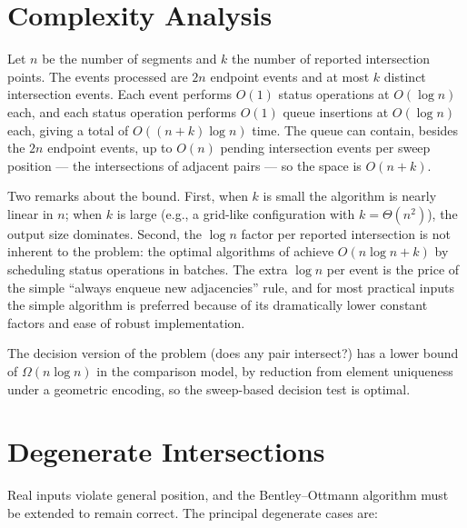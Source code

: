 
\section{Complexity Analysis}
\label{sec:segint_complexity}

Let $n$ be the number of segments and $k$ the number of reported
intersection points. The events processed are $2n$ endpoint events and at
most $k$ distinct intersection events. Each event performs $O(1)$ status
operations at $O(\log n)$ each, and each status operation performs $O(1)$
queue insertions at $O(\log n)$ each, giving a total of
$O((n+k)\log n)$ time. The queue can contain, besides the $2n$ endpoint
events, up to $O(n)$ pending intersection events per sweep position --- the
intersections of adjacent pairs --- so the space is $O(n+k)$.

Two remarks about the bound. First, when $k$ is small the algorithm is
nearly linear in $n$; when $k$ is large (e.g., a grid-like configuration
with $k = \Theta(n^2)$), the output size dominates. Second, the $\log n$
factor per reported intersection is not inherent to the problem: the
optimal algorithms of \cite{chazelle1992,balaban1995} achieve
$O(n\log n + k)$ by scheduling status operations in batches. The extra
$\log n$ per event is the price of the simple ``always enqueue new
adjacencies'' rule, and for most practical inputs the simple algorithm is
preferred because of its dramatically lower constant factors and ease of
robust implementation.

The decision version of the problem (does any pair intersect?) has a lower
bound of $\Omega(n\log n)$ in the comparison model, by reduction from
element uniqueness under a geometric encoding, so the sweep-based decision
test is optimal.


\section{Degenerate Intersections}
\label{sec:segint_degenerate}

Real inputs violate general position, and the Bentley--Ottmann algorithm
must be extended to remain correct. The principal degenerate cases are:


